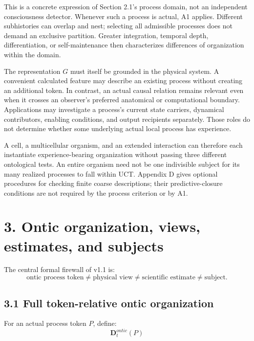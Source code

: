 \documentclass[
  11pt,
  a4paper,
]{article}
\begin{document}
This is a concrete expression of Section 2.1's process domain, not an
independent consciousness detector. Whenever such a process is actual,
A1 applies. Different subhistories can overlap and nest; selecting all
admissible processes does not demand an exclusive partition. Greater
integration, temporal depth, differentiation, or self-maintenance then
characterizes differences of organization within the domain.

The representation \(G\) must itself be grounded in the physical system.
A convenient calculated feature may describe an existing process without
creating an additional token. In contrast, an actual causal relation
remains relevant even when it crosses an observer's preferred anatomical
or computational boundary. Applications may investigate a process's
current state carriers, dynamical contributors, enabling conditions, and
output recipients separately. Those roles do not determine whether some
underlying actual local process has experience.

A cell, a multicellular organism, and an extended interaction can
therefore each instantiate experience-bearing organization without
passing three different ontological tests. An entire organism need not
be one indivisible subject for its many realized processes to fall
within UCT. Appendix D gives optional procedures for checking finite
coarse descriptions; their predictive-closure conditions are not
required by the process criterion or by A1.

\hypertarget{ontic-organization-views-estimates-and-subjects}{%
\section{3. Ontic organization, views, estimates, and
subjects}\label{ontic-organization-views-estimates-and-subjects}}

The central formal firewall of v1.1 is:
\nopagebreak[4]
\[
\boxed{
\text{ontic process token}
\neq
\text{physical view}
\neq
\text{scientific estimate}
\neq
\text{subject}.
}
\]

\hypertarget{full-token-relative-ontic-organization}{%
\subsection{3.1 Full token-relative ontic
organization}\label{full-token-relative-ontic-organization}}

For an actual process token \(P\), define:
\nopagebreak[4]
\[
\boxed{
\mathbf D^{ontic}_t(P)
}
\]
\end{document}
